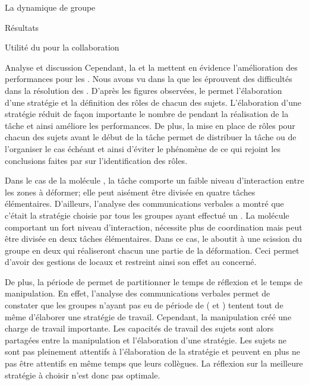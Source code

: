 \documentclass[myfrancais,ngerman,english,frenchb]{mythesis}
\begin{document}
\begin{mychapter}{La dynamique de groupe}
\begin{mysection}{Résultats}
\begin{mysubsection}{Utilité du \mybrainstorming pour la collaboration}
\begin{mysubsubsection}{Analyse et discussion}
					Cependant, la  et la  mettent en évidence l'amélioration des performances pour les .
					Nous avons vu dans la  que les  éprouvent des difficultés dans la résolution des .
					D'après les figures observées, le \mybrainstorming permet l'élaboration d'une stratégie et la définition des rôles de chacun des sujets.
					L'élaboration d'une stratégie réduit de façon importante le nombre de  pendant la réalisation de la tâche et ainsi améliore les performances.
					De plus, la mise en place de rôles pour chacun des sujets avant le début de la tâche permet de distribuer la tâche ou de l'organiser le cas échéant et ainsi d'éviter le phénomène de  ce qui rejoint les conclusions faites par  sur l'identification des rôles.

					Dans le cas de la molécule \myPrion, la tâche comporte un faible niveau d'interaction entre les zones à déformer; elle peut aisément être divisée en quatre tâches élémentaires.
					D'ailleurs, l'analyse des communications verbales a montré que c'était la stratégie choisie par tous les groupes ayant effectué un \mybrainstorming.
					La molécule \myUbiquitin comportant un fort niveau d'interaction, nécessite plus de coordination mais peut être divisée en deux tâches élémentaires.
					Dans ce cas, le \mybrainstorming aboutit à une scission du groupe en deux  qui réaliseront chacun une partie de la déformation.
					Ceci permet d'avoir des gestions de  locaux et restreint ainsi son effet au  concerné.

					De plus, la période de \mybrainstorming permet de partitionner le temps de réflexion et le temps de manipulation.
					En effet, l'analyse des communications verbales permet de constater que les groupes n'ayant pas eu de période de \mybrainstorming ( et ) tentent tout de même d'élaborer une stratégie de travail.
					Cependant, la manipulation créé une charge de travail importante.
					Les capacités de travail des sujets sont alors partagées entre la manipulation et l'élaboration d'une stratégie.
					Les sujets ne sont pas pleinement attentifs à l'élaboration de la stratégie et peuvent en plus ne pas être attentifs en même temps que leurs collègues.
					La réflexion sur la meilleure stratégie à choisir n'est donc pas optimale.


\end{mysubsubsection}
\end{mysubsection}
\end{mysection}
\end{mychapter}
\end{document}

